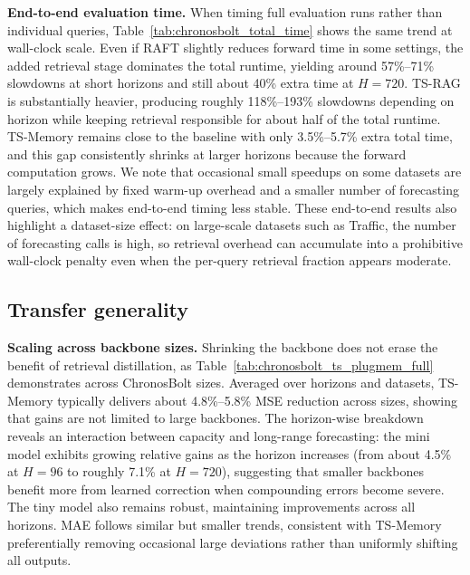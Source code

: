 \noindent\textbf{End-to-end evaluation time.}
When timing full evaluation runs rather than individual queries, Table~\ref{tab:chronosbolt_total_time} shows the same trend at wall-clock scale. Even if RAFT slightly reduces forward time in some settings, the added retrieval stage dominates the total runtime, yielding around 57\%--71\% slowdowns at short horizons and still about 40\% extra time at $H=720$. TS-RAG is substantially heavier, producing roughly 118\%--193\% slowdowns depending on horizon while keeping retrieval responsible for about half of the total runtime. TS-Memory remains close to the baseline with only 3.5\%--5.7\% extra total time, and this gap consistently shrinks at larger horizons because the forward computation grows. We note that occasional small speedups on some datasets are largely explained by fixed warm-up overhead and a smaller number of forecasting queries, which makes end-to-end timing less stable. These end-to-end results also highlight a dataset-size effect: on large-scale datasets such as Traffic, the number of forecasting calls is high, so retrieval overhead can accumulate into a prohibitive wall-clock penalty even when the per-query retrieval fraction appears moderate.




\subsection{Transfer generality}
\label{appx:transferability}

\noindent\textbf{Scaling across backbone sizes.}
Shrinking the backbone does not erase the benefit of retrieval distillation, as Table~\ref{tab:chronosbolt_ts_plugmem_full} demonstrates across ChronosBolt sizes. Averaged over horizons and datasets, TS-Memory typically delivers about 4.8\%--5.8\% MSE reduction across sizes, showing that gains are not limited to large backbones. The horizon-wise breakdown reveals an interaction between capacity and long-range forecasting: the mini model exhibits growing relative gains as the horizon increases (from about 4.5\% at $H=96$ to roughly 7.1\% at $H=720$), suggesting that smaller backbones benefit more from learned correction when compounding errors become severe. The tiny model also remains robust, maintaining improvements across all horizons. MAE follows similar but smaller trends, consistent with TS-Memory preferentially removing occasional large deviations rather than uniformly shifting all outputs.


